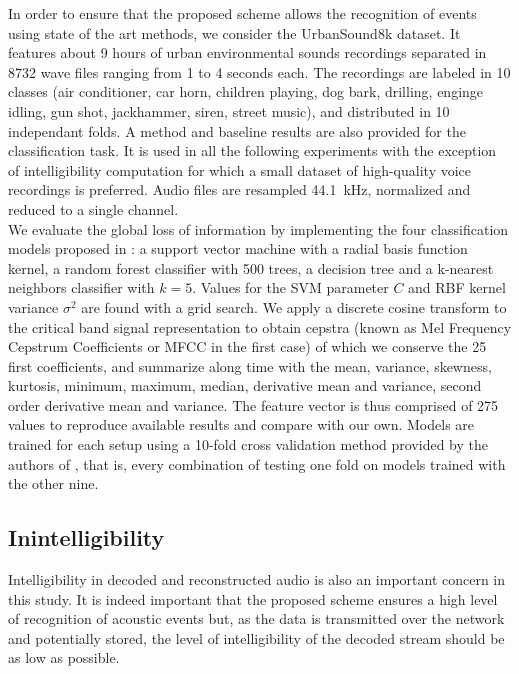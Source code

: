 \documentclass[final,3p,times,twocolumn]{elsarticle}
\begin{document}
In order to ensure that the proposed scheme allows the recognition of events using state of the art methods, we consider the UrbanSound8k dataset\cite{salamon2014}. It features about 9 hours of urban environmental sounds recordings separated in 8732 wave files ranging from 1 to 4 seconds each. The recordings are labeled in 10 classes (air conditioner, car horn, children playing, dog bark, drilling, enginge idling, gun shot, jackhammer, siren, street music), and distributed in 10 independant folds. A method and baseline results are also provided for the classification task. It is used in all the following experiments with the exception of intelligibility computation for which a small dataset of high-quality voice recordings is preferred. Audio files are resampled 44.1~kHz, normalized and reduced to a single channel.\\

We evaluate the global loss of information by implementing the four classification models proposed in \cite{salamon2014}: a support vector machine with a radial basis function kernel, a random forest classifier with 500 trees, a decision tree and a k-nearest neighbors classifier with $k = 5$. Values for the SVM parameter $C$ and RBF kernel variance $\sigma^2$ are found with a grid search. We apply a discrete cosine transform to the critical band signal representation to obtain cepstra (known as Mel Frequency Cepstrum Coefficients or MFCC in the first case) of which we conserve the 25 first coefficients, and summarize along time with the mean, variance, skewness, kurtosis, minimum, maximum, median, derivative mean and variance, second order derivative mean and variance. The feature vector is thus comprised of 275 values to reproduce available results and compare with our own. Models are trained for each setup using a 10-fold cross validation method provided by the authors of \cite{salamon2014}, that is, every combination of testing one fold on models trained with the other nine.

\subsection{Inintelligibility} \label{sec:inintelligibility}

Intelligibility in decoded and reconstructed audio is also an important concern in this study. It is indeed important that the proposed scheme ensures a high level of recognition of acoustic events but, as the data is transmitted over the network and potentially stored, the level of intelligibility of the decoded stream should be as low as possible.
\end{document}
